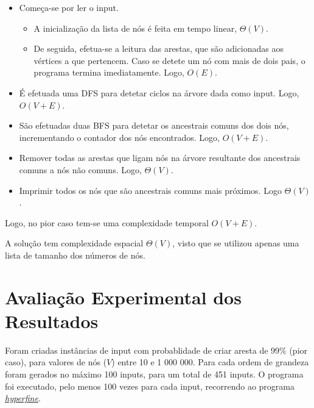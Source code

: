 \documentclass[12pt,a4paper]{article}
\begin{document}
  \begin{itemize}
    \setlength{\itemsep}{0pt}
    \item Começa-se por ler o input.
    \begin{itemize}
      \setlength{\itemsep}{0pt}
      \item A inicialização da lista de nós é feita em tempo linear, $\Theta(V)$.
      \item De seguida, efetua-se a leitura das arestas, que são adicionadas aos vértices a que pertencem.
      Caso se detete um nó com mais de dois pais, o programa termina imediatamente. Logo, $O(E)$.
    \end{itemize}

  \item É efetuada uma DFS para detetar ciclos na árvore dada como input. Logo, $O(V + E)$.

  \item São efetuadas duas BFS para detetar os ancestrais comuns dos dois nós, incrementando o contador dos nós encontrados. Logo, $O(V + E)$.

  \item Remover todas as arestas que ligam nós na árvore resultante dos ancestrais comuns a nós não comuns. Logo, $\Theta(V)$.

  \item Imprimir todos os nós que são ancestrais comuns mais próximos. Logo $\Theta(V)$.
  \end{itemize}

  Logo, no pior caso tem-se uma complexidade temporal $O(V + E)$.

  A solução tem complexidade espacial $\Theta(V)$, visto que se utilizou apenas uma lista de tamanho dos números de nós.

  \section{Avaliação Experimental dos Resultados}

  Foram criadas instâncias de input com probablidade de criar aresta de 99\% (pior caso), para valores de nós ($V$) entre 10 e 1 000 000. Para cada ordem de grandeza foram gerados no máximo 100 inputs, para um total de 451 inputs.
  O programa foi executado, pelo menos 100 vezes para cada input, recorrendo ao programa \href{https://github.com/sharkdp/hyperfine}{\textit{hyperfine}}.
    
\end{document}
